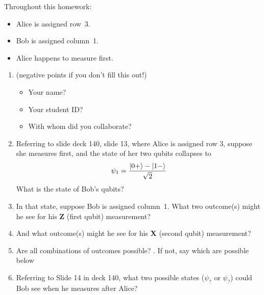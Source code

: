 \documentclass[12pt]{article}
\begin{document}
Throughout this homework:
\begin{itemize}
    \item Alice is assigned row~3.
    \item Bob is assigned column~1.  
    \item Alice happens to measure first.
    \end{itemize}
\begin{enumerate}[font=\bfseries]
\item {} (negative points if you don't fill this out!)
\begin{itemize}
    \item Your name?
    \item Your student ID?
    \item With whom did you collaborate?
\end{itemize}
    \item {} Referring to slide deck 140, slide 13, where Alice is assigned row 3, suppose she measures first, and the state of her two qubits collapses to \[ \psi_{1}=\frac{\ket{0+}-\ket{1-}}{\sqrt{2}} \]
    What is the state of Bob's qubits? 
    
    \item {} In that state, suppose Bob is assigned column~1.  What two outcome(s) might he see for his \textbf{Z} (first qubit) measurement?
    
    \item {} And what outcome(s) might he see for his \textbf{X} (second qubit) measurement?
    
    
    \item {} Are all combinations of outcomes possible?  \Blank{}.  If not, say which are possible below
    
    \item {} Referring to Slide 14 in deck 140, what two possible states ($\psi_{?}$ or $\psi_{?}$) could Bob see when he measures after Alice?
    

\end{enumerate}
\end{document}
